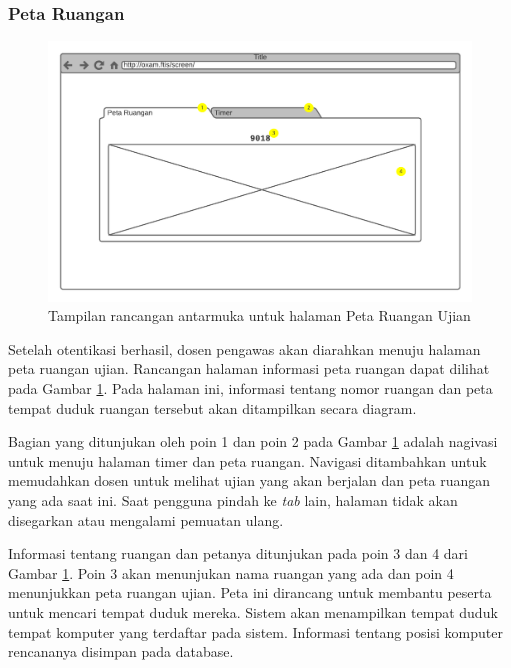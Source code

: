 \subsubsection{Peta Ruangan}
    \begin{figure}
        \centering
        \includegraphics[width=0.7\paperwidth]{Gambar/mockups/Mockup--DosenPengawas - Seatmap.pdf}
        \caption{Tampilan rancangan antarmuka untuk halaman Peta Ruangan Ujian}
        \label{fig:mockup_dosen_seatmap}
    \end{figure}
    Setelah otentikasi berhasil, dosen pengawas akan diarahkan menuju halaman peta ruangan
    ujian. Rancangan halaman informasi peta ruangan dapat dilihat pada Gambar 
    \ref{fig:mockup_dosen_seatmap}. Pada halaman ini, informasi tentang nomor ruangan dan peta
    tempat duduk ruangan tersebut akan ditampilkan secara diagram.
    
    Bagian yang ditunjukan oleh poin 1 dan poin 2 pada Gambar \ref{fig:mockup_dosen_seatmap}
    adalah nagivasi untuk menuju halaman timer dan peta ruangan. Navigasi ditambahkan untuk 
    memudahkan dosen untuk melihat ujian yang akan berjalan dan peta ruangan yang ada saat ini.
    Saat pengguna pindah ke \textit{tab} lain, halaman tidak akan disegarkan atau mengalami pemuatan
    ulang. 
    
    Informasi tentang ruangan dan petanya ditunjukan pada poin 3 dan 4 dari Gambar 
    \ref{fig:mockup_dosen_seatmap}. Poin 3 akan menunjukan nama ruangan yang ada dan poin
    4 menunjukkan peta ruangan ujian. Peta ini dirancang untuk membantu peserta untuk mencari
    tempat duduk mereka. Sistem akan menampilkan tempat duduk tempat komputer yang terdaftar
    pada sistem. Informasi tentang posisi komputer rencananya disimpan pada database.
    

